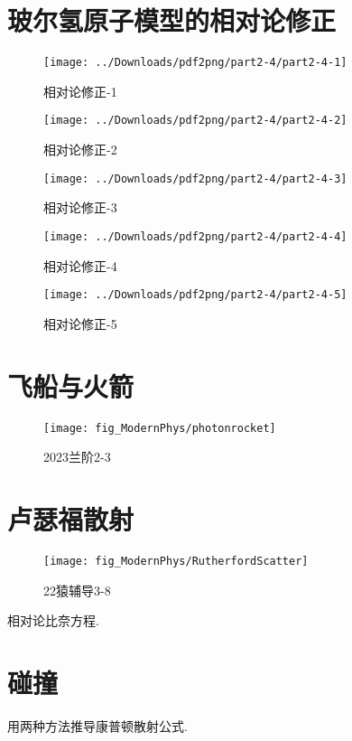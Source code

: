 \documentclass[a4paper]{article}
\begin{document}
	\section{玻尔氢原子模型的相对论修正}
	\begin{figure}[H]
		\centering
		\texttt{[image: ../Downloads/pdf2png/part2-4/part2-4-1]}
		\caption{相对论修正-1}
		\label{fig:part2-4-1}
	\end{figure}
	\begin{figure}[H]
		\centering
		\texttt{[image: ../Downloads/pdf2png/part2-4/part2-4-2]}
		\caption{相对论修正-2}
		\label{fig:part2-4-2}
	\end{figure}
	\begin{figure}[H]
		\centering
		\texttt{[image: ../Downloads/pdf2png/part2-4/part2-4-3]}
		\caption{相对论修正-3}
		\label{fig:part2-4-3}
	\end{figure}
	\begin{figure}[H]
		\centering
		\texttt{[image: ../Downloads/pdf2png/part2-4/part2-4-4]}
		\caption{相对论修正-4}
		\label{fig:part2-4-4}
	\end{figure}
	\begin{figure}[H]
		\centering
		\texttt{[image: ../Downloads/pdf2png/part2-4/part2-4-5]}
		\caption{相对论修正-5}
		\label{fig:part2-4-5}
	\end{figure}
	
	\section{飞船与火箭}
	\begin{figure}[H]
		\centering
		\texttt{[image: fig\_ModernPhys/photonrocket]}
		\caption{2023兰阶2-3}
		\label{fig:photonrocket}
	\end{figure}
	
	\section{卢瑟福散射}
	\begin{figure}[H]
		\centering
		\texttt{[image: fig\_ModernPhys/RutherfordScatter]}
		\caption{22猿辅导3-8}
		\label{fig:rutherfordscatter}
	\end{figure}
	相对论比奈方程.
	
	\section{碰撞}
	\begin{framed}
		用两种方法推导康普顿散射公式.
	\end{framed}
		
\end{document}
